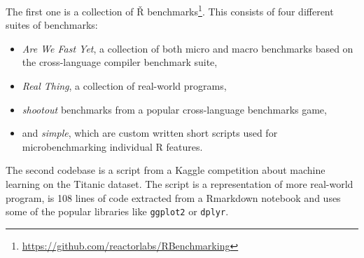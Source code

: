 The first one is a collection of Ř benchmarks\footnote{\url{https://github.com/reactorlabs/RBenchmarking}}. This consists of four different suites of benchmarks:
\begin{itemize}
  \item{} \textit{Are We Fast Yet}, a collection of both micro and macro benchmarks based on the cross-language compiler benchmark suite\cite{are-we-fast-yet},
	\item{} \textit{Real Thing}, a collection of real-world programs,
  \item{} \textit{shootout} benchmarks from a popular cross-language benchmarks game\cite{shootout},
	\item{} and \textit{simple}, which are custom written short scripts used for microbenchmarking individual R features.
\end{itemize}

The second codebase is a script from a Kaggle competition about machine learning on the Titanic dataset\cite{titanic}. The script is a representation of more real-world program, is 108 lines of code extracted from a Rmarkdown notebook and uses some of the popular libraries like \texttt{ggplot2} or \texttt{dplyr}.

